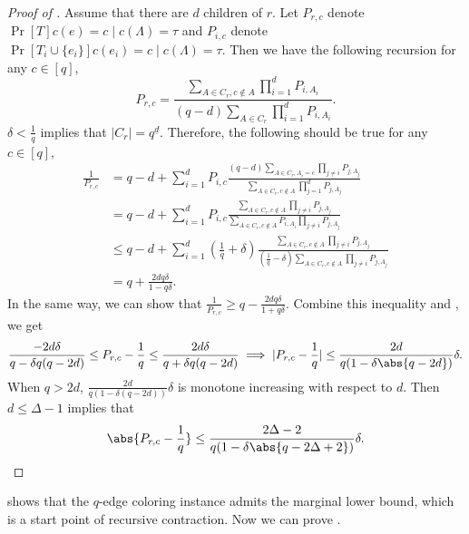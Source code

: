 \documentclass[a4paper,11pt]{article}
\begin{document}
\begin{proof}[Proof of ]
    Assume that there are $d$ children of $r$.
    Let $P_{r,c}$ denote $\Pr[T]{c(e) = c\mid c(\Lambda) = \tau}$ and $P_{i,c}$ denote $\Pr[T_i\cup\{e_i\}]{c(e_i) = c\mid c(\Lambda) = \tau}$.
    Then we have the following recursion for any $c\in [q]$, 
    $$
        P_{r,c} = \frac{\displaystyle \sum_{A\in C_r, c\notin A}\prod_{i=1}^d P_{i,A_i}}{(q-d) \displaystyle \sum_{A\in C_r}\prod_{i=1}^d P_{i,A_i}}.
    $$
    $\delta < \frac 1q$ implies that $|C_r| = q^{\underline{d}}$. Therefore, the following should be true for any $c\in[q]$,
    \begin{align}
        \nonumber \frac 1{P_{r,c}} &= q - d + \sum_{i=1}^d P_{i,c}\frac{\displaystyle (q-d)\sum_{A\in C_r, A_i = c}\prod_{j\neq i}P_{j,A_j}}{\displaystyle \sum_{A\in C_r, c\notin A}\prod_{j=1}^d P_{j,A_j}}
        \\\nonumber &= q - d + \sum_{i=1}^d P_{i,c}\frac{\displaystyle \sum_{A\in C_r, c\notin A}\prod_{j\neq i}P_{j,A_j}}{\displaystyle \sum_{A\in C_r, c\notin A}P_{i,A_i}\prod_{j\neq i} P_{j,A_j}}
        \\\nonumber &\leq q - d + \sum_{i=1}^d (\frac 1q + \delta)\frac{\displaystyle \sum_{A\in C_r, c\notin A}\prod_{j\neq i}P_{j,A_j}}{\displaystyle (\frac 1q - \delta)\sum_{A\in C_r, c\notin A}\prod_{j\neq i} P_{j,A_j}}
        \\ \label{eq:left_side_WSM_contraction} &= q + \frac{2dq\delta}{1-q\delta}.
    \end{align}
    In the same way, we can show that $\frac 1{P_{r,c}} \geq q - \frac{2dq\delta}{1 + q\delta}$. 
    Combine this inequality and , we get
    $$
        \frac{-2d\delta}{q-\delta q(q-2d)}\leq P_{r,c} - \frac 1q \leq \frac{2d\delta}{q+\delta q(q-2d)}
        \implies |P_{r,c} - \frac 1q| \leq \frac{2d}{q(1 - \delta\abs{q-2d})} \delta.
    $$
    When $q > 2d$, $\frac{2d}{q(1 - \delta(q-2d))} \delta$ is monotone increasing with respect to $d$. Then $d\leq \Delta - 1$ implies that
    \[
        \abs{P_{r,c} - \frac 1q} \leq \frac{2\Delta - 2}{q(1 - \delta\abs{q-2\Delta + 2})} \delta.
        \qedhere
    \]
\end{proof}
 shows that the $q$-edge coloring instance admits the marginal lower bound, which is a start point of recursive contraction.
Now we can prove .
\end{document}
